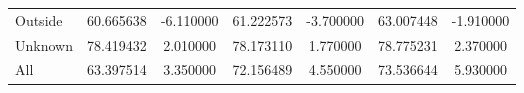 \begin{table}[!ht]
\begin{tabular}{lSSSSSS@{}}
        \tabindent  Outside         & 60.665638                                      & -6.110000                                   & 61.222573                                     & -3.700000 & 63.007448    & -1.910000 \\
        \tabindent  Unknown         & 78.419432                                      & 2.010000                                    & 78.173110                                     & 1.770000  & 78.775231    & 2.370000  \\
        \cmidrule(rl){1-7}
        All                         & 63.397514                                      & 3.350000                                    & 72.156489                                     & 4.550000  & 73.536644    & 5.930000  \\
        \bottomrule
    \end{tabular}
\end{table}

\restoregeometry

